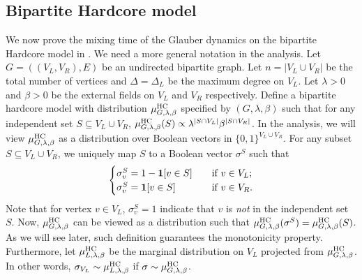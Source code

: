 \documentclass[11pt,a4paper]{article}
\theoremstyle{definition}
\newcommand{\abs}[1]{\left\vert#1\right\vert}
\def\*#1{\mathbf{#1}} %
\begin{document}
\subsection{Bipartite Hardcore model}
We now prove the mixing time of the Glauber dynamics on the bipartite Hardcore model in .
We need a more general notation in the analysis.
Let $G=((V_L,V_R),E)$ be an undirected bipartite graph.
Let $n=\abs{V_L\cup V_R}$ be the total number of vertices and $\Delta=\Delta_L$ be the maximum degree on $V_L$.
Let $\lambda > 0$ and $\beta > 0$ be the external fields on $V_L$ and $V_R$ respectively.
Define a bipartite hardcore model with distribution $\mu_{G,\lambda,\beta}^{\textnormal{HC}}$ specified by $(G,\lambda,\beta)$ such that for any independent set $S \subseteq V_L \cup V_R$, $\mu_{G,\lambda,\beta}^{\textnormal{HC}}(S) \propto \lambda^{|S \cap V_L|}\beta^{|S \cap V_R|}$.
In the analysis, we will view $\mu_{G,\lambda,\beta}^{\textnormal{HC}}$ as a distribution over Boolean vectors in $\{0,1\}^{V_L\cup V_R}$. For any subset $S \subseteq V_L \cup V_R$, we uniquely map $S$ to a Boolean vector $\sigma^S$ such that
\begin{align}\label{eq:bhc-mapping}
    \begin{cases}
        \sigma^S_v = 1 - \*1[v \in S] \quad &\textnormal{if } v\in V_L;\\
    \sigma^S_v = \*1[v \in S] \quad &\textnormal{if } v\in V_R.
    \end{cases}
\end{align}
Note that for vertex $v \in V_L$, $\sigma^S_v = 1$ indicate that $v$ is \emph{not} in the independent set $S$. 
Now, $\mu_{G,\lambda,\beta}^{\textnormal{HC}}$ can be viewed as a distribution such that $\mu_{G,\lambda,\beta}^{\textnormal{HC}}(\sigma^S) = \mu_{G,\lambda,\beta}^{\textnormal{HC}}(S)$.
As we will see later, such definition guarantees the monotonicity property.
Furthermore, let $\mu_{L,\lambda,\beta}^{\textnormal{HC}}$ be the marginal distribution on $V_L$ projected from $\mu_{G,\lambda,\beta}^{\textnormal{HC}}$.
In other words, $\sigma_{V_L} \sim \mu_{L,\lambda,\beta}^{\textnormal{HC}}$ if $\sigma \sim \mu_{G,\lambda,\beta}^{\textnormal{HC}}$.
\end{document}
